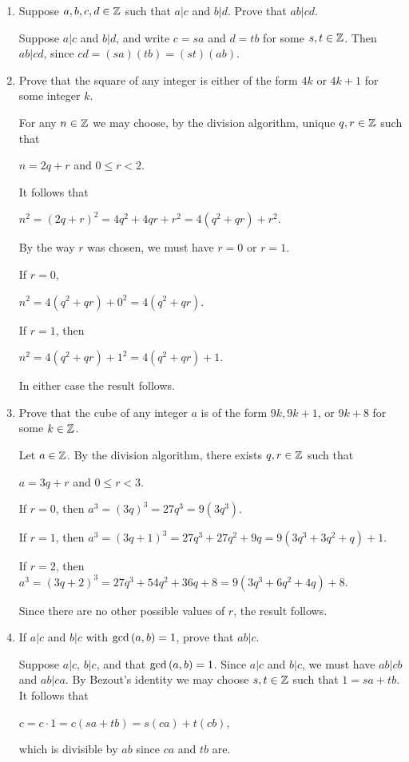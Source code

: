 \documentclass[11pt,fleqn,dvipsnames,usenames]{article}
\newcommand{\p}{\noindent}
\begin{document}
\begin{enumerate}
\item Suppose $a,b,c,d\in\mathbb{Z}$ such that $a|c$ and $b|d$.  Prove that $ab|cd$.
\vsmsp

\solution Suppose $a|c$ and $b|d$, and write $c = sa$ and $d = tb$ for some $s,t\in\mathbb{Z}$.  Then $ab|cd$, since $cd = (sa)(tb) = (st)(ab)$.

\item Prove that the square of any integer is either of the form $4k$ or $4k+1$ for some integer $k$.
\vsmsp

\solution For any $n\in\mathbb{Z}$ we may choose, by the division algorithm, unique $q,r\in\mathbb{Z}$ such that
\begin{center}
$n = 2q + r$ and $0\leq r < 2$.
\end{center}

\p It follows that
\begin{center}
$n^2 = (2q+r)^2 = 4q^2 + 4qr + r^2 = 4(q^2 + qr) + r^2$.
\end{center}
By the way $r$ was chosen, we must have $r=0$ or $r=1$.
\vsp

If $r = 0$,
\begin{center}
$n^2 = 4(q^2 + qr) + 0^2 = 4(q^2 + qr)$.
\end{center}
If $r = 1$, then
\begin{center}
$n^2 = 4(q^2 + qr) + 1^2 = 4(q^2 + qr) + 1$.
\end{center}
In either case the result follows.

\item Prove that the cube of any integer $a$ is of the form $9k, 9k+1$, or $9k+8$ for some $k\in\mathbb{Z}$.
\vsmsp

\solution Let $a\in\mathbb{Z}$.  By the division algorithm, there exists $q,r\in\mathbb{Z}$ such that
\begin{center}
$a = 3q + r$ and $0\leq r < 3$.
\end{center}
\p If $r = 0$, then $a^3 = (3q)^3 = 27q^3 = 9(3q^3)$.
\vsmsp

\p If $r = 1$, then $a^3 = (3q + 1)^3 = 27q^3 + 27q^2 + 9q = 9(3q^3 + 3q^2 + q) + 1$.
\vsmsp

\p If $r = 2$, then $a^3 = (3q + 2)^3 = 27q^3 + 54q^2 + 36q + 8 = 9(3q^3 + 6q^2 + 4q) + 8$.
\vsmsp

\p Since there are no other possible values of $r$, the result follows.

\item If $a|c$ and $b|c$ with $\text{gcd}\left(a,b\right) = 1$, prove that $ab|c$.\label{abdividesc}
\vsmsp

\solution Suppose $a|c$, $b|c$, and that $\text{gcd}\left(a,b\right) = 1$.  Since $a|c$ and $b|c$, we must have $ab|cb$ and $ab|ca$.  By Bezout's identity we may choose $s,t\in\mathbb{Z}$ such that $1 = sa + tb$.  It follows that
\begin{center}
$c = c\cdot 1 = c(sa + tb) = s(ca) + t(cb)$,
\end{center}
which is divisible by $ab$ since $ca$ and $tb$ are.


\end{enumerate}
\end{document}
